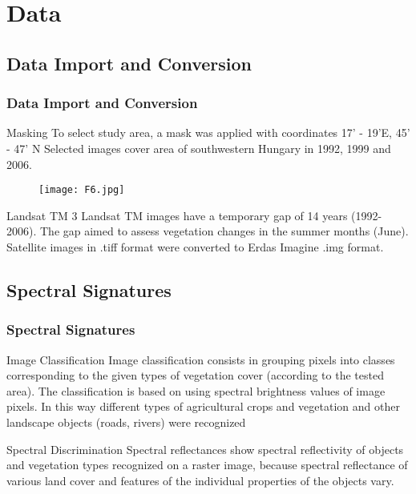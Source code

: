 \documentclass[pdflatex,compress,10pt,
	xcolor={dvipsnames,dvipsnames,svgnames,x11names,table},
	hyperref={
	breaklinks = true, 
	pdfauthor={Lemenkova Polina}, 
	pdfsubject={Preentation}, 
	pdfcreator={Lemenkova Polina}, 
	pdfproducer={Lemenkova Polina}, 
	citecolor=NavyBlue, 
	urlcolor = NavyBlue, 
	breaklinks = true}]{beamer}
\begin{document}
\section{Data}
\subsection{Data Import and Conversion}
\begin{frame}\frametitle{Data Import and Conversion}

\begin{alertblock}{Masking}
To select study area, a mask was applied with coordinates 17' - 19'E, 45' - 47' N Selected images cover area of southwestern Hungary in 1992, 1999 and 2006.
\end{alertblock}

\begin{figure}[H]
	\centering
		\texttt{[image: F6.jpg]}
\end{figure}

\begin{block}{Landsat TM}
3 Landsat TM images have a temporary gap of 14 years (1992-2006). The gap aimed to assess vegetation changes in the summer months (June). Satellite images in .tiff format were converted to Erdas Imagine .img format.
\end{block}

\end{frame}

\subsection{Spectral Signatures}
\begin{frame}\frametitle{Spectral Signatures}

\begin{alertblock}{Image Classification}
Image classification consists in grouping pixels into classes corresponding to the given types of vegetation cover (according to the tested area). The classification is based on using spectral brightness values of image pixels. In this way different types of agricultural crops and vegetation and other landscape objects (roads, rivers) were recognized
\end{alertblock}

\begin{block}{Spectral Discrimination}
Spectral reflectances show spectral reflectivity of objects and vegetation types recognized on a raster image, because spectral reflectance of various land cover and features of the individual properties of the objects vary.
\end{block}

\end{frame}
\end{document}
